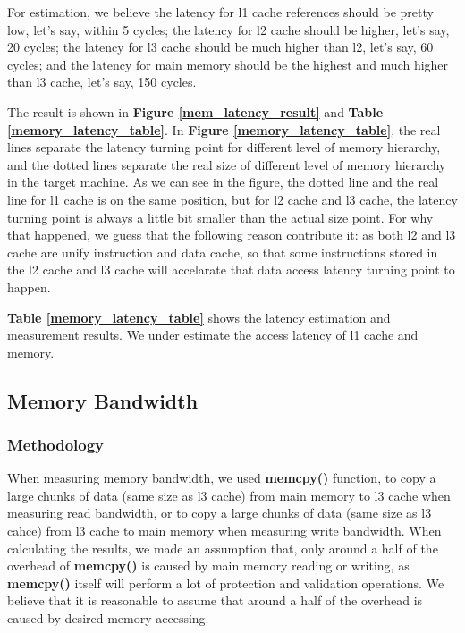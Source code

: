 For estimation, we believe the latency for l1 cache references should be pretty low, let's say, within 5 cycles; the latency for l2 cache should be higher, let's say, 20 cycles; the latency for l3 cache should be much higher than l2, let's say, 60 cycles; and the latency for main memory should be the highest and much higher than l3 cache, let's say, 150 cycles.

The result is shown in \textbf{Figure \ref{mem_latency_result}} and \textbf{Table \ref{memory_latency_table}}. In \textbf{Figure \ref{memory_latency_table}}, the real lines separate the latency turning point for different level of memory hierarchy, and the dotted lines separate the real size of different level of memory hierarchy in the target machine. As we can see in the figure, the dotted line and the real line for l1 cache is on the same position, but for l2 cache and l3 cache, the latency turning point is always a little bit smaller than the actual size point. For why that happened, we guess that the following reason contribute it: as both l2 and l3 cache are unify instruction and data cache, so that some instructions stored in the l2 cache and l3 cache will accelarate that data access latency turning point to happen.

\textbf{Table \ref{memory_latency_table}} shows the latency estimation and measurement results. We under estimate the access latency of l1 cache and memory.

\subsection{Memory Bandwidth}

\subsubsection{Methodology}

When measuring memory bandwidth, we used \textbf{memcpy()} function, to copy a large chunks of data (same size as l3 cache) from main memory to l3 cache when measuring read bandwidth, or to copy a large chunks of data (same size as l3 cahce) from l3 cache to main memory when measuring write bandwidth. When calculating the results, we made an assumption that, only around a half of the overhead of \textbf{memcpy()} is caused by main memory reading or writing, as \textbf{memcpy()} itself will perform a lot of protection and validation operations. We believe that it is reasonable to assume that around a half of the overhead is caused by desired memory accessing.

